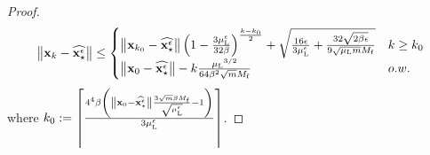 \begin{proof}
\begin{align*}
    \left\Vert{\mathbf{x}}_{k} - \widehat{{{\mathbf{x}}_\star^\epsilon}}\right\Vert \leq 
    \begin{cases}
        \left\Vert{\mathbf{x}}_{k_0} - \widehat{{{\mathbf{x}}_\star^\epsilon}}\right\Vert \left(1-\frac{3{\mu_{\mathrm{L}}^\epsilon}}{32\beta}\right)^\frac{k-k_0}{2} + \sqrt{\frac{16\epsilon}{3{\mu_{\mathrm{L}}^\epsilon}}+\frac{32 \sqrt{2\beta \epsilon}}{9 \sqrt{{\mu_{\mathrm{L}}} m} M_{\mathrm{f}}}}  & k\geq k_0\\
        \left\Vert{\mathbf{x}}_0 - \widehat{{{\mathbf{x}}_\star^\epsilon}}\right\Vert- k \frac{{\mu_{\mathrm{L}}}^{3/2}}{64 \beta^2 \sqrt{m} M_{\mathrm{f}}} & o.w.
    \end{cases}
\end{align*}
where $k_0 := \left\lceil \frac{4^4  \beta  \left(\left\Vert{\mathbf{x}}_0 - \widehat{{{\mathbf{x}}_\star^\epsilon}}\right\Vert \frac{3\sqrt{m}\beta M_{\mathrm{f}}}{\sqrt{{\mu_{\mathrm{L}}^\epsilon} }} -1\right) }{ 3{\mu_{\mathrm{L}}^\epsilon}}\right\rceil$.
\end{proof}






